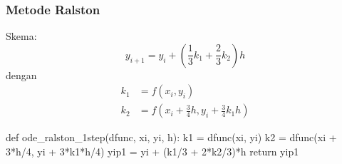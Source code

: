 \begin{frame}[fragile]
\frametitle{Metode Ralston}

Skema:
\begin{equation*}
y_{i+1} = y_i + \left( \frac{1}{3}k_1 + \frac{2}{3}k_2 \right) h
\end{equation*}
dengan
\begin{align*}
k_1 & = f(x_i, y_i) \\
k_2 & = f\left( x_i + \frac{3}{4}h, y_i + \frac{3}{4}k_1 h \right)
\end{align*}

\begin{pythoncode}
def ode_ralston_1step(dfunc, xi, yi, h):
    k1 = dfunc(xi, yi)
    k2 = dfunc(xi + 3*h/4, yi + 3*k1*h/4)
    yip1 = yi + (k1/3 + 2*k2/3)*h
    return yip1
\end{pythoncode}

\end{frame}
